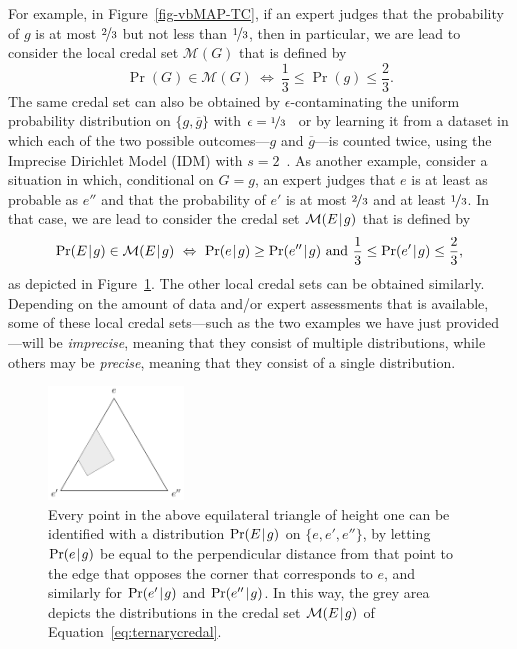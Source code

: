 \documentclass[10pt,a4paper]{paper}
\theoremstyle{definition}
\newcommand{\credal}{\mathcal{M}}
\newcommand{\newmid}{\hspace{0.9pt}\vert\hspace{0.9pt}}
\begin{document}
For example, in Figure~\ref{fig-vbMAP-TC}, if an expert judges that the probability of $g$ is at most $\nicefrac{2}{3}$ but not less than $\nicefrac{1}{3}$, then in particular, we are lead to consider the local credal set $\credal(G)$ that is defined by
\begin{equation}\label{eq:binarycredal}
\Pr(G)\in\credal(G)
~\Leftrightarrow~
\frac{1}{3}\leq\Pr(g)\leq\frac{2}{3}.
\end{equation}
The same credal set can also be obtained by $\epsilon$-contaminating the uniform probability distribution on $\{g,\overline{g}\}$ with $\epsilon=\nicefrac{1}{3}$~\cite{berger1985statistical} or by learning it from a dataset in which each of the two possible outcomes---$g$ and $\overline{g}$---is counted twice, using the Imprecise Dirichlet Model (IDM) with $s=2$~\cite{Bernard:2005hd,Walley:1996vt}. As another example, consider a situation in which, conditional on $G=g$, an expert judges that $e$ is at least as probable as $e''$ and that the probability of $e'$ is at most $\nicefrac{2}{3}$ and at least $\nicefrac{1}{3}$. In that case, we are lead to consider the credal set $\credal(E\newmid g)$ that is defined by
\begin{equation}\label{eq:ternarycredal}
\Pr(E\newmid g)\in\credal(E\newmid g)
~\Leftrightarrow~
\Pr(e\newmid g)\geq\Pr(e''\newmid g)
\text{~and~}
\frac{1}{3}\leq\Pr(e'\newmid g)\leq\frac{2}{3},
\end{equation}
as depicted in Figure~\ref{fig:ternarycredal}. The other local credal sets can be obtained similarly. Depending on the amount of data and/or expert assessments that is available, some of these local credal sets---such as the two examples we have just provided---will be \emph{imprecise}, meaning that they consist of multiple distributions, while others may be \emph{precise}, meaning that they consist of a single distribution. 

\begin{figure}[t]
\begin{center}
\includegraphics[width=0.32\textwidth]{triangle.pdf}
\vspace{7pt}
\caption{Every point in the above equilateral triangle of height one can be identified with a distribution $\Pr(E\newmid g)$ on $\{e,e',e''\}$, by letting $\Pr(e\newmid g)$ be equal to the perpendicular distance from that point to the edge that opposes the corner that corresponds to $e$, and similarly for $\Pr(e'\newmid g)$ and $\Pr(e''\newmid g)$.
In this way, the grey area depicts the distributions in the credal set 
$\credal(E\newmid g)$ of Equation~\eqref{eq:ternarycredal}.}
\label{fig:ternarycredal}
\end{center}
\end{figure}
\end{document}
